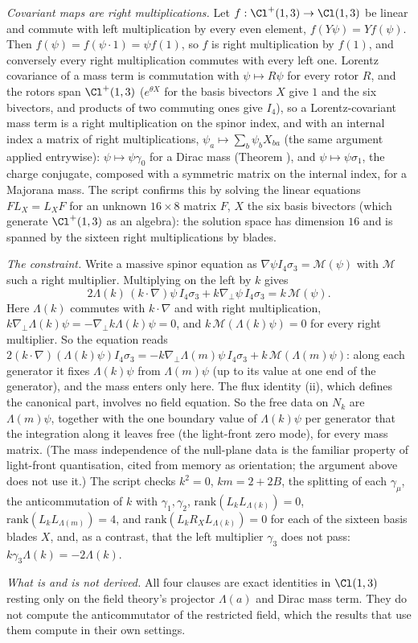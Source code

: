 \emph{Covariant maps are right multiplications.} Let $f : \Cl^{+}(1,3) \to \Cl(1,3)$ be linear and commute with left multiplication by every even element, $f(Y\psi) = Yf(\psi)$. Then $f(\psi) = f(\psi\cdot 1) = \psi f(1)$, so $f$ is right multiplication by $f(1)$, and conversely every right multiplication commutes with every left one. Lorentz covariance of a mass term is commutation with $\psi \mapsto R\psi$ for every rotor $R$, and the rotors span $\Cl^{+}(1,3)$ ($e^{\theta X}$ for the basis bivectors $X$ give $1$ and the six bivectors, and products of two commuting ones give $I_{4}$), so a Lorentz-covariant mass term is a right multiplication on the spinor index, and with an internal index a matrix of right multiplications, $\psi_{a} \mapsto \sum_{b}\psi_{b}X_{ba}$ (the same argument applied entrywise): $\psi \mapsto \psi\gamma_{0}$ for a Dirac mass (Theorem ), and $\psi \mapsto \psi\sigma_{1}$, the charge conjugate, composed with a symmetric matrix on the internal index, for a Majorana mass. The script confirms this by solving the linear equations $FL_{X} = L_{X}F$ for an unknown $16 \times 8$ matrix $F$, $X$ the six basis bivectors (which generate $\Cl^{+}(1,3)$ as an algebra): the solution space has dimension $16$ and is spanned by the sixteen right multiplications by blades.

\emph{The constraint.} Write a massive spinor equation as $\nabla\psi I_{4}\sigma_{3} = \mathcal{M}(\psi)$ with $\mathcal{M}$ such a right multiplier. Multiplying on the left by $k$ gives
\[
2\Lambda(k)\,(k\cdot\nabla)\psi\,I_{4}\sigma_{3} + k\nabla_{\perp}\psi\,I_{4}\sigma_{3} = k\,\mathcal{M}(\psi).
\]
Here $\Lambda(k)$ commutes with $k\cdot\nabla$ and with right multiplication, $k\nabla_{\perp}\Lambda(k)\psi = -\nabla_{\perp}k\Lambda(k)\psi = 0$, and $k\,\mathcal{M}(\Lambda(k)\psi) = 0$ for every right multiplier. So the equation reads $2(k\cdot\nabla)(\Lambda(k)\psi)I_{4}\sigma_{3} = -k\nabla_{\perp}\Lambda(m)\psi\,I_{4}\sigma_{3} + k\,\mathcal{M}(\Lambda(m)\psi)$: along each generator it fixes $\Lambda(k)\psi$ from $\Lambda(m)\psi$ (up to its value at one end of the generator), and the mass enters only here. The flux identity (ii), which defines the canonical part, involves no field equation. So the free data on $N_{k}$ are $\Lambda(m)\psi$, together with the one boundary value of $\Lambda(k)\psi$ per generator that the integration along it leaves free (the light-front zero mode), for every mass matrix. (The mass independence of the null-plane data is the familiar property of light-front quantisation, cited from memory as orientation; the argument above does not use it.) The script checks $k^{2} = 0$, $km = 2 + 2B$, the splitting of each $\gamma_{\mu}$, the anticommutation of $k$ with $\gamma_{1}, \gamma_{2}$, $\mathrm{rank}(L_{k}L_{\Lambda(k)}) = 0$, $\mathrm{rank}(L_{k}L_{\Lambda(m)}) = 4$, and $\mathrm{rank}(L_{k}R_{X}L_{\Lambda(k)}) = 0$ for each of the sixteen basis blades $X$, and, as a contrast, that the left multiplier $\gamma_{3}$ does not pass: $k\gamma_{3}\Lambda(k) = -2\Lambda(k)$.

\emph{What is and is not derived.} All four clauses are exact identities in $\Cl(1,3)$ resting only on the field theory's projector $\Lambda(a)$ and Dirac mass term. They do not compute the anticommutator of the restricted field, which the results that use them compute in their own settings.
